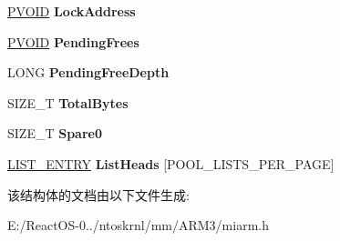 \begin{DoxyCompactItemize}
\hyperlink{interfacevoid}{P\+V\+O\+ID} {\bfseries Lock\+Address}
\item 
\mbox{\label{struct___p_o_o_l___d_e_s_c_r_i_p_t_o_r_ac47a73a1a97dffec51e6aacb038f813a}} 
\hyperlink{interfacevoid}{P\+V\+O\+ID} {\bfseries Pending\+Frees}
\item 
\mbox{\label{struct___p_o_o_l___d_e_s_c_r_i_p_t_o_r_ab0a11ce17b4b35162078e087a9905b2e}} 
L\+O\+NG {\bfseries Pending\+Free\+Depth}
\item 
\mbox{\label{struct___p_o_o_l___d_e_s_c_r_i_p_t_o_r_aab7c94db66eb9fd0bab06e78816dbae6}} 
S\+I\+Z\+E\+\_\+T {\bfseries Total\+Bytes}
\item 
\mbox{\label{struct___p_o_o_l___d_e_s_c_r_i_p_t_o_r_add1f48703d773a7b7128701f014252b3}} 
S\+I\+Z\+E\+\_\+T {\bfseries Spare0}
\item 
\mbox{\label{struct___p_o_o_l___d_e_s_c_r_i_p_t_o_r_a134fcd2103b5b0ea9ee6d5bf2fa3644c}} 
\hyperlink{struct___l_i_s_t___e_n_t_r_y}{L\+I\+S\+T\+\_\+\+E\+N\+T\+RY} {\bfseries List\+Heads} \mbox{[}P\+O\+O\+L\+\_\+\+L\+I\+S\+T\+S\+\_\+\+P\+E\+R\+\_\+\+P\+A\+GE\mbox{]}
\end{DoxyCompactItemize}


该结构体的文档由以下文件生成\+:\begin{DoxyCompactItemize}
\item 
E\+:/\+React\+O\+S-\/0../ntoskrnl/mm/\+A\+R\+M3/miarm.\+h\end{DoxyCompactItemize}
